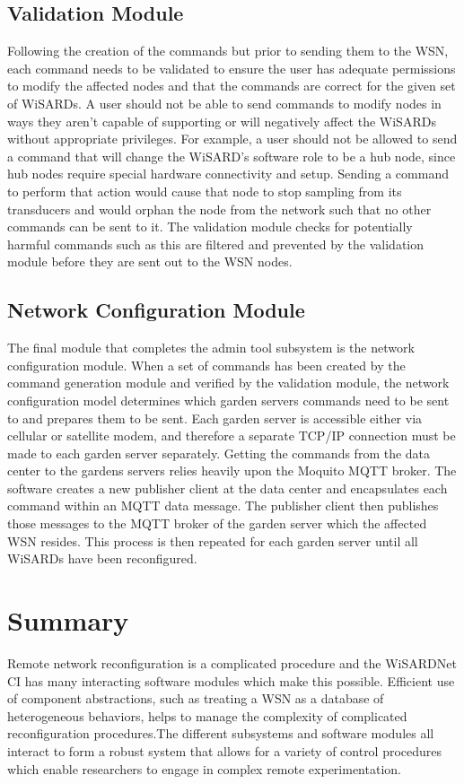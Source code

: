 \subsection{Validation Module}
Following the creation of the commands but prior to sending them to the WSN, each command needs to be validated to ensure the user has adequate permissions to modify the affected nodes and that the commands are correct for the given set of WiSARDs. A user should not be able to send commands to modify nodes in ways they aren't capable of supporting or will negatively affect the WiSARDs without appropriate privileges. For example, a user should not be allowed to send a command that will change the WiSARD's software role to be a hub node, since hub nodes require special hardware connectivity and setup. Sending a command to perform that action would cause that node to stop sampling from its transducers and would orphan the node from the network such that no other commands can be sent to it. The validation module checks for potentially harmful commands such as this are filtered and prevented by the validation module before they are sent out to the WSN nodes.

\subsection{Network Configuration Module}
The final module that completes the admin tool subsystem is the network configuration module. When a set of commands has been created by the command generation module and verified by the validation module, the network configuration model determines which garden servers commands need to be sent to and prepares them to be sent. Each garden server is accessible either via cellular or satellite modem, and therefore a separate TCP/IP connection must be made to each garden server separately. Getting the commands from the data center to the gardens servers relies heavily upon the Moquito MQTT broker. The software creates a new publisher client at the data center and encapsulates each command within an MQTT data message. The publisher client then publishes those messages to the MQTT broker of the garden server which the affected WSN resides. This process is then repeated for each garden server until all WiSARDs have been reconfigured.

\section{Summary}
Remote network reconfiguration is a complicated procedure and the WiSARDNet CI has many interacting software modules which make this possible. Efficient use of component abstractions, such as treating a WSN as a database of heterogeneous behaviors, helps to manage the complexity of complicated reconfiguration procedures.The different subsystems and software modules all interact to form a robust system that allows for a variety of control procedures which enable researchers to engage in complex remote experimentation.